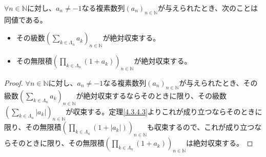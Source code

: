 \documentclass[dvipdfmx]{jsarticle}
\begin{document}
\begin{thm}\label{4.3.4.5}
$\forall n \in \mathbb{N}$に対し、$a_{n} \neq - 1$なる複素数列$\left( a_{n} \right)_{n \in \mathbb{N}}$が与えられたとき、次のことは同値である。
\begin{itemize}
\item
  その級数$\left( \sum_{k \in \varLambda_{n}} a_{k} \right)_{n \in \mathbb{N}}$が絶対収束する。
\item
  その無限積$\left( \prod_{k \in \varLambda_{n}} \left( 1 + a_{k} \right) \right)_{n \in \mathbb{N}}$が絶対収束する。
\end{itemize}
\end{thm}
\begin{proof}
$\forall n \in \mathbb{N}$に対し、$a_{n} \neq - 1$なる複素数列$\left( a_{n} \right)_{n \in \mathbb{N}}$が与えられたとき、その級数$\left( \sum_{k \in \varLambda_{n}} a_{k} \right)_{n \in \mathbb{N}}$が絶対収束するならそのときに限り、その級数$\left( \sum_{k \in \varLambda_{n}} \left| a_{k} \right| \right)_{n \in \mathbb{N}}$が収束する。定理\ref{4.3.4.3}よりこれが成り立つならそのときに限り、その無限積$\left( \prod_{k \in \varLambda_{n}} \left( 1 + \left| a_{k} \right| \right) \right)_{n \in \mathbb{N}}$も収束するので、これが成り立つならそのときに限り、その無限積$\left( \prod_{k \in \varLambda_{n}} \left( 1 + a_{k} \right) \right)_{n \in \mathbb{N}}$は絶対収束する。
\end{proof}
\end{document}
